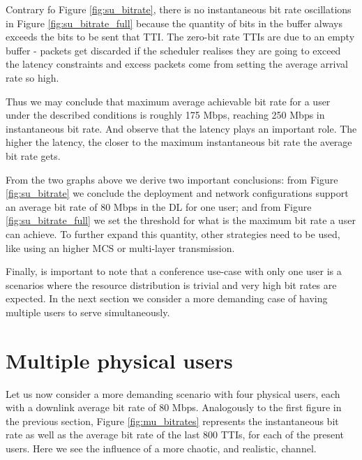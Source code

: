 
Contrary fo Figure \ref{fig:su_bitrate}, there is no instantaneous bit rate oscillations in Figure \ref{fig:su_bitrate_full} because the quantity of bits in the buffer always exceeds the bits to be sent that TTI. The zero-bit rate TTIs are due to an empty buffer - packets get discarded if the scheduler realises they are going to exceed the latency constraints and excess packets come from setting the average arrival rate so high.

Thus we may conclude that maximum average achievable bit rate for a user under the described conditions is roughly 175 Mbps, reaching 250 Mbps in instantaneous bit rate. And observe that the latency plays an important role. The higher the latency, the closer to the maximum instantaneous bit rate the average bit rate gets. 

From the two graphs above we derive two important conclusions: from Figure \ref{fig:su_bitrate} we conclude the deployment and network configurations support an average bit rate of 80 Mbps in the \ac{DL} for one user; and from Figure \ref{fig:su_bitrate_full} we set the threshold for what is the maximum bit rate a user can achieve. To further expand this quantity, other strategies need to be used, like using an higher MCS or multi-layer transmission.

Finally, is important to note that a conference use-case with only one user is a scenarios where the resource distribution is trivial and very high bit rates are expected. In the next section we consider a more demanding case of having multiple users to serve simultaneously.



\section{Multiple physical users} \label{sec:multi-user}

Let us now consider a more demanding scenario with four physical users, each with a downlink average bit rate of 80 Mbps. Analogously to the first figure in the previous section, Figure \ref{fig:mu_bitrates} represents the instantaneous bit rate as well as the average bit rate of the last 800 TTIs, for each of the present users. Here we see the influence of a more chaotic, and realistic, channel.


